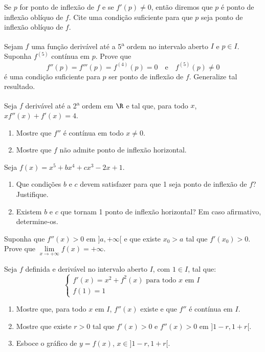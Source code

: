 \begin{exercicio}[5]
Se $p$ for ponto de inflexão de $f$ e se $f'(p) \neq 0$, então diremos que $p$ é ponto de inflexão oblíquo de $f$. Cite uma condição suficiente para que $p$ seja ponto de inflexão oblíquo de $f$.
\end{exercicio}

\begin{exercicio}[6]
Sejam $f$ uma função derivável até a 5\textsuperscript{a} ordem no intervalo aberto $I$ e $p \in I$. Suponha $f^{(5)}$ contínua em $p$. Prove que
\[
f''(p) = f'''(p) = f^{(4)}(p) = 0 \quad\text{e}\quad f^{(5)}(p) \neq 0
\]
é uma condição suficiente para $p$ ser ponto de inflexão de $f$. Generalize tal resultado.
\end{exercicio}

\begin{exercicio}[7]
Seja $f$ derivável até a 2\textsuperscript{a} ordem em $\R$ e tal que, para todo $x$, $xf''(x) + f'(x) = 4$.
\begin{enumerate}[label=\alph*)]
    \item Mostre que $f''$ é contínua em todo $x \neq 0$.
    \item Mostre que $f$ não admite ponto de inflexão horizontal.
\end{enumerate}
\end{exercicio}

\begin{exercicio}[8]
Seja $f(x) = x^5 + bx^4 + cx^3 - 2x + 1$.
\begin{enumerate}[label=\alph*)]
    \item Que condições $b$ e $c$ devem satisfazer para que 1 seja ponto de inflexão de $f$? Justifique.
    \item Existem $b$ e $c$ que tornam 1 ponto de inflexão horizontal? Em caso afirmativo, determine-os.
\end{enumerate}
\end{exercicio}

\begin{exercicio}[9]
Suponha que $f''(x) > 0$ em $]a, +\infty[$ e que existe $x_0 > a$ tal que $f'(x_0) > 0$. Prove que $\lim\limits_{x \to +\infty} f(x) = +\infty$.
\end{exercicio}

\begin{exercicio}[10]
Seja $f$ definida e derivável no intervalo aberto $I$, com $1 \in I$, tal que:
\[
\begin{cases}
f'(x) = x^2 + f^2(x) \text{ para todo } x \text{ em } I \\
f(1) = 1
\end{cases}
\]
\begin{enumerate}[label=\alph*)]
    \item Mostre que, para todo $x$ em $I$, $f''(x)$ existe e que $f''$ é contínua em $I$.
    \item Mostre que existe $r > 0$ tal que $f'(x) > 0$ e $f''(x) > 0$ em $]1 - r, 1 + r[$.
    \item Esboce o gráfico de $y = f(x)$, $x \in ]1 - r, 1 + r[$.
\end{enumerate}
\end{exercicio}


